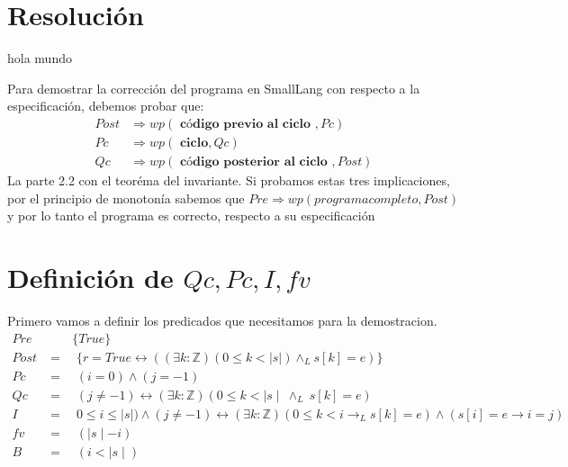 \documentclass[12pt]{book}
\begin{document}
\section{Resoluci\'on}


hola mundo














\begin{shaded}
Para demostrar la corrección del programa en SmallLang con respecto a la especificación, debemos probar que:
\begin{align}
Post &\Rightarrow wp( \textbf{ c\'odigo previo al ciclo } , Pc) \\
Pc &\Rightarrow wp (\textbf{ ciclo}, Qc ) \\
Qc & \Rightarrow wp ( \textbf{ c\'odigo posterior al ciclo }, Post) 
\end{align}
La parte 2.2 con el teor\'ema del invariante. Si probamos estas tres implicaciones, por el principio de monoton\'ia sabemos que  $ Pre \Rightarrow wp(  programa completo  , Post)  $  y por lo tanto el programa  es correcto, respecto a su especificaci\'on
\end{shaded}

\section{Definici\'on de $ Qc, Pc, I, fv$}
Primero vamos a definir los predicados que necesitamos para la demostracion.
\begin{align*}
Pre & \quad \quad \{ True \}  \\
Post &= \quad \{ r = True \leftrightarrow ((\exists k :\mathbb{Z})(0 \leq k < |s|) \wedge_L s[k] = e)\} \\
Pc &= \quad (i = 0) \wedge (j = -1) \\
Qc &=  \quad(j \neq -1) \leftrightarrow (\exists k : \mathbb{Z})(0 \leq k < \mid s\mid \ \wedge_{L} \ s[k] = e) \\
I &= \quad 0 \leq i \leq  \mid s \mid) \wedge (j \neq -1) \leftrightarrow (\exists k : \mathbb{Z})(0 \leq k < i \rightarrow_L s[k] = e) \wedge (s[i] = e \rightarrow i = j)  \\
fv &= \quad ( \mid s \mid - i )\\
B &= \quad (i < \mid s \mid)
\end{align*}
\end{document}
